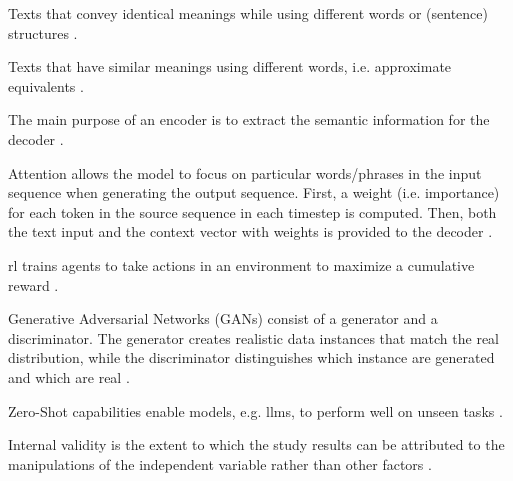 \begin{definition}
    [Paraphrases]
    Texts that convey identical meanings while using different words or (sentence) structures 
    \cite{fu_learning_2024,zhou_paraphrase_2021,palivela_optimization_2021,kurt_pehlivanoglu_comparative_2024}.
\end{definition}

\begin{definition}
    Texts that have similar meanings using different words, i.e. approximate equivalents \cite{zhou_paraphrase_2025}.
\end{definition}

\begin{definition}
    [Encoder]
    The main purpose of an encoder is to extract the semantic information for the decoder \cite{zhou_paraphrase_2021}.
\end{definition}

\begin{definition}
    Attention allows the model to focus on particular words/phrases in the input sequence when generating the output sequence.
    First, a weight (i.e. importance) for each token in the source sequence in each timestep is computed.
    Then, both the text input and the context vector with weights is provided to the decoder \cite{zhou_paraphrase_2021}.
\end{definition}

\begin{definition}
    [\acl{rl}]
    \ac{rl} trains agents to take actions in an environment to maximize a cumulative reward \cite{zhou_paraphrase_2021}.
\end{definition}

\begin{definition}
    [GANs]
    Generative Adversarial Networks (GANs) consist of a generator and a discriminator.
    The generator creates realistic data instances that match the real distribution, 
    while the discriminator distinguishes which instance are generated and which are real \cite{zhou_paraphrase_2021}.
\end{definition}

\begin{definition}
    Zero-Shot capabilities enable models, e.g. \acp{llm}, to perform well on unseen tasks \cite{master_thesis_paraphrasing_2024}.
\end{definition}

\begin{definition}
    Internal validity is the extent to which the study results can be attributed 
    to the manipulations of the independent variable rather than other factors \cite{master_thesis_paraphrasing_2024}.
\end{definition}

